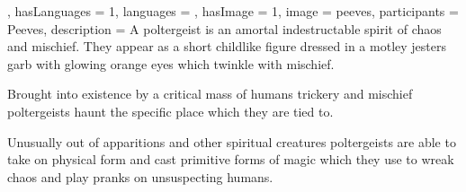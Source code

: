 {{, hasLanguages = 1, languages = , hasImage = 1, image = peeves, 
participants = { {Peeves}}, 
description = A poltergeist is an amortal\comma{} indestructable spirit of chaos and mischief. They appear as a short\comma{} childlike figure dressed in a motley jester\apos{}s garb\comma{} with glowing orange eyes\comma{} which twinkle with mischief. 

Brought into existence by a critical mass of humans\comma{} trickery and mischief\comma{} poltergeists haunt the specific place which they are tied to. 

Unusually out of apparitions and other spiritual creatures\comma{} poltergeists are able to take on physical form and cast primitive forms of magic \minus{} which they use to wreak chaos and play pranks on unsuspecting humans.}}

